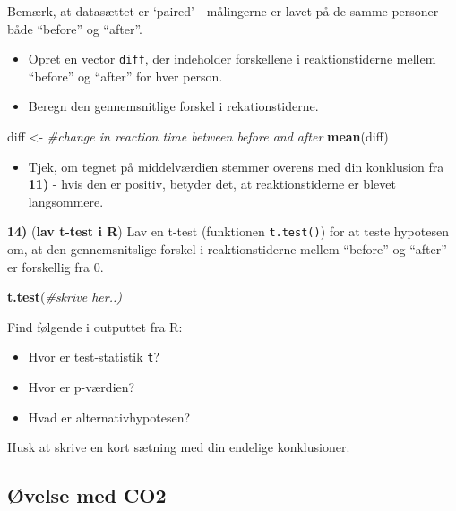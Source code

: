 \documentclass[
]{book}
\newenvironment{Shaded}{\begin{snugshade}}{\end{snugshade}}
\newcommand{\CommentTok}[1]{\textcolor[rgb]{0.56,0.35,0.01}{\textit{#1}}}
\newcommand{\FunctionTok}[1]{\textcolor[rgb]{0.13,0.29,0.53}{\textbf{#1}}}
\newcommand{\NormalTok}[1]{#1}
\newcommand{\OtherTok}[1]{\textcolor[rgb]{0.56,0.35,0.01}{#1}}
\providecommand{\tightlist}{%
  \setlength{\itemsep}{0pt}\setlength{\parskip}{0pt}}
\begin{document}
Bemærk, at datasættet er `paired' - målingerne er lavet på de samme personer både ``before'' og ``after''.

\begin{itemize}
\tightlist
\item
  Opret en vector \texttt{diff}, der indeholder forskellene i reaktionstiderne mellem ``before'' og ``after'' for hver person.
\item
  Beregn den gennemsnitlige forskel i rekationstiderne.
\end{itemize}

\begin{Shaded}
\begin{Highlighting}[]
\NormalTok{diff }\OtherTok{\textless{}{-}} \CommentTok{\#change in reaction time between before and after}
\FunctionTok{mean}\NormalTok{(diff)}
\end{Highlighting}
\end{Shaded}

\begin{itemize}
\tightlist
\item
  Tjek, om tegnet på middelværdien stemmer overens med din konklusion fra \textbf{11)} - hvis den er positiv, betyder det, at reaktionstiderne er blevet langsommere.
\end{itemize}

\textbf{14)} (\textbf{lav t-test i R}) Lav en t-test (funktionen \texttt{t.test()}) for at teste hypotesen om, at den gennemsnitslige forskel i reaktionstiderne mellem ``before'' og ``after'' er forskellig fra 0.

\begin{Shaded}
\begin{Highlighting}[]
\FunctionTok{t.test}\NormalTok{(}\CommentTok{\#skrive her..)}
\end{Highlighting}
\end{Shaded}

Find følgende i outputtet fra R:

\begin{itemize}
\tightlist
\item
  Hvor er test-statistik \texttt{t}?
\item
  Hvor er p-værdien?
\item
  Hvad er alternativhypotesen?
\end{itemize}

Husk at skrive en kort sætning med din endelige konklusioner.

\subsection{Øvelse med CO2}\label{uxf8velse-med-co2}
\end{document}
